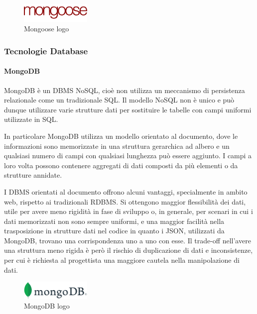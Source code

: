 \begin{figure}[H]
\centering
\includegraphics[width=0.3\textwidth]{img/logos/mongoose_logo.png}
\caption{Mongoose logo}
\label{fig:mongoose}
\end{figure}

\subsubsection{Tecnologie Database}
\paragraph{MongoDB}
MongoDB è un DBMS NoSQL, cioè non utilizza un meccanismo di persistenza relazionale come un tradizionale SQL.
Il modello NoSQL non è unico e può dunque utilizzare varie strutture dati per sostituire le tabelle con campi uniformi utilizzate in SQL.

In particolare MongoDB utilizza un modello orientato al documento, dove le informazioni sono memorizzate in una struttura gerarchica ad albero e un qualsiasi numero di campi con qualsiasi lunghezza può essere aggiunto. I campi a loro volta possono contenere aggregati di dati composti da più elementi o da strutture annidate.

I DBMS orientati al documento offrono alcuni vantaggi, specialmente in ambito web, rispetto ai tradizionali RDBMS. Si ottengono maggior flessibilità dei dati, utile per avere meno rigidità in fase di sviluppo o, in generale, per scenari in cui i dati memorizzati non sono sempre uniformi, e una maggior facilità nella trasposizione in strutture dati nel codice in quanto i JSON, utilizzati da MongoDB, trovano una corrispondenza uno a uno con esse. Il trade-off nell'avere una struttura meno rigida è però il rischio di duplicazione di dati e inconsistenze, per cui è richiesta al progettista una maggiore cautela nella manipolazione di dati.

\begin{figure}[H]
\centering
\includegraphics[width=0.3\textwidth]{img/logos/mongo_logo.png}
\caption{MongoDB logo}
\label{fig:mongodb}
\end{figure}


